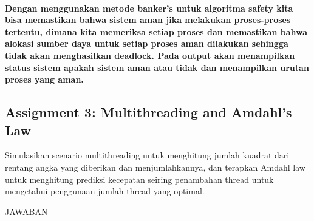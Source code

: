 \documentclass[12pt]{article}
\begin{document}
\paragraph{
\hspace*{1cm} Dengan menggunakan metode banker's untuk algoritma safety kita bisa memastikan bahwa sistem aman jika melakukan proses-proses tertentu, dimana kita memeriksa setiap proses dan memastikan bahwa alokasi sumber daya untuk setiap proses aman dilakukan sehingga tidak akan menghasilkan deadlock. Pada output akan menampilkan status sistem apakah sistem aman atau tidak dan menampilkan urutan proses yang aman.
}


\subsection{Assignment 3: Multithreading and Amdahl's Law}
\hspace*{1cm} Simulasikan scenario multithreading untuk menghitung jumlah kuadrat dari rentang angka yang diberikan dan menjumlahkannya, dan terapkan Amdahl law untuk menghitung prediksi kecepatan seiring penambahan thread untuk mengetahui penggunaan jumlah thread yang optimal.
\newline
\newline

\begin{center}
    \underline{JAWABAN}
\end{center}
\end{document}
